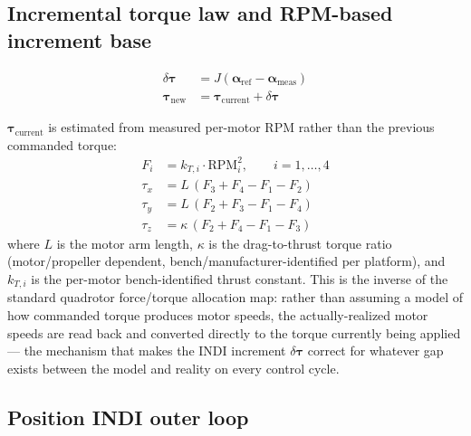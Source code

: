 \documentclass[11pt,a4paper]{article}
\begin{document}
\subsection{Incremental torque law and RPM-based increment base}

\begin{align}
  \delta\boldsymbol{\tau} &= J\left(\boldsymbol{\alpha}_{\mathrm{ref}}
    - \boldsymbol{\alpha}_{\mathrm{meas}}\right) \label{eq:incremental-torque}\\
  \boldsymbol{\tau}_{\mathrm{new}} &= \boldsymbol{\tau}_{\mathrm{current}} + \delta\boldsymbol{\tau}
\end{align}

$\boldsymbol{\tau}_{\mathrm{current}}$ is estimated from measured per-motor RPM rather than the
previous commanded torque:
\begin{align}
  F_i &= k_{T,i}\cdot \mathrm{RPM}_i^2, \qquad i=1,\dots,4 \label{eq:tau-current}\\
  \tau_x &= L\,(F_3+F_4-F_1-F_2) \\
  \tau_y &= L\,(F_2+F_3-F_1-F_4) \\
  \tau_z &= \kappa\,(F_2+F_4-F_1-F_3)
\end{align}
where $L$ is the motor arm length, $\kappa$ is the drag-to-thrust torque ratio (motor/propeller
dependent, bench/manufacturer-identified per platform), and $k_{T,i}$ is the per-motor
bench-identified thrust constant. This is the inverse of the standard quadrotor force/torque
allocation map: rather than assuming a model of how commanded torque produces motor speeds, the
actually-realized motor speeds are read back and converted directly to the torque currently being
applied --- the mechanism that makes the INDI increment $\delta\boldsymbol{\tau}$ correct for
whatever gap exists between the model and reality on every control cycle.

\subsection{Position INDI outer loop}
\end{document}
